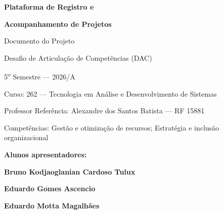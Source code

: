 \documentclass[a4paper,12pt,oneside]{article}
\begin{document}
\begin{titlepage}

\color{canvas}
\centering
\vspace*{5.0cm}

{\Huge\bfseries Plataforma de Registro e\par}
\vspace{0.25cm}
{\Huge\bfseries Acompanhamento de Projetos\par}

\vspace{0.8cm}
{\Large\color{surfacestrong} Documento do Projeto\par}

\vspace{0.65cm}
{\normalsize\color{mutedsoft} Desafio de Articulação de Competências (DAC)\par}
\vspace{0.18cm}
{\normalsize\color{mutedsoft} 5\textsuperscript{o} Semestre --- 2026/A\par}

\vspace{0.75cm}
{\small\color{mutedsoft} Curso: 262 --- Tecnologia em Análise e Desenvolvimento de Sistemas\par}
\vspace{0.15cm}
{\small\color{mutedsoft} Professor Referência: Alexandre dos Santos Batista --- RF 15881\par}
\vspace{0.15cm}
{\small\color{mutedsoft} Competências: Gestão e otimização de recursos; Estratégia e inclusão organizacional\par}

\vspace{0.9cm}
{\normalsize\bfseries Alunos apresentadores:\par}
\vspace{0.35cm}
{\normalsize\bfseries Bruno Kodjaoglanian Cardoso Tulux\par}
\vspace{0.18cm}
{\normalsize\bfseries Eduardo Gomes Ascencio\par}
\vspace{0.18cm}
{\normalsize\bfseries Eduardo Motta Magalhães\par}


\end{titlepage}
\end{document}
